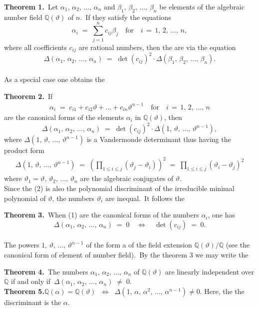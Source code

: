 \documentclass[12pt]{article}
\theoremstyle{definition}
\begin{document}
\textbf{Theorem 1.}\, Let $\alpha_1,\,\alpha_2,\,\ldots,\,\alpha_n$ and $\beta_1,\,\beta_2,\,\ldots,\,\beta_n$ be elements of the algebraic number field $\mathbb{Q}(\vartheta)$ of  $n$.\, If they satisfy the equations
$$\alpha_i \;=\; \sum_{j=1}^nc_{ij}\beta_j \quad \mbox{for} \quad i \,=\, 1,\,2,\,\ldots,\,n,$$
where all coefficients $c_{ij}$ are rational numbers, then the  are  via the equation
$$\Delta(\alpha_1,\,\alpha_2,\,\ldots,\,\alpha_n) 
  \;=\; \det\!(c_{ij})^2\cdot\Delta(\beta_1,\,\beta_2,\,\ldots,\,\beta_n).$$\\

As a special case one obtains the

\textbf{Theorem 2.}\, If
\begin{align}
\alpha_i \;=\; c_{i1}+c_{i2}\vartheta+\ldots+c_{in}\vartheta^{n-1} \quad \mbox{for} \quad i \,=\, 1,\,2,\,\ldots,\,n
\end{align}
are the canonical forms of the elements $\alpha_i$ in $\mathbb{Q}(\vartheta)$, then 
$$\Delta(\alpha_1,\,\alpha_2,\,\ldots,\,\alpha_n) 
  \;=\; \det\!(c_{ij})^2\cdot\Delta(1,\,\vartheta,\,\ldots,\,\vartheta^{n-1}),$$
where $\Delta(1,\,\vartheta,\,\ldots,\,\vartheta^{n-1})$ is a Vandermonde determinant thus
having the product form
\begin{align}
\Delta(1,\,\vartheta,\,\ldots,\,\vartheta^{n-1}) 
\;=\; \left(\prod_{1 \le i \le j}(\vartheta_j-\vartheta_i)\right)^{\!2} 
\;=\; \prod_{1 \le i \le j}(\vartheta_i-\vartheta_j)^2
\end{align}
where $\vartheta_1 = \vartheta,\,\vartheta_2,\,\ldots,\,\vartheta_n$ are the algebraic conjugates of $\vartheta$.\\

Since the  (2) is also the polynomial discriminant of the irreducible minimal polynomial of $\vartheta$, the numbers $\vartheta_i$ are inequal.\, It follows the

\textbf{Theorem 3.}\, When (1) are the canonical forms of the numbers $\alpha_i$, one has
$$\Delta(\alpha_1,\,\alpha_2,\,\ldots,\,\alpha_n) \;=\; 0 \quad 
\Longleftrightarrow \quad \det(c_{ij}) \;=\; 0.$$\\

The powers $1,\,\vartheta,\,\ldots,\,\vartheta^{n-1}$ of the  form a  of the field extension $\mathbb{Q}(\vartheta)/\mathbb{Q}$ (see the canonical form of element of number field).\, By the theorem 3 we may write the

\textbf{Theorem 4.}\, The numbers $\alpha_1,\,\alpha_2,\,\ldots,\,\alpha_n$ of $\mathbb{Q}(\vartheta)$ are linearly independent over $\mathbb{Q}$ if and only if\, $\Delta(\alpha_1,\,\alpha_2,\,\ldots,\,\alpha_n) \;\neq\; 0$.\\

\textbf{Theorem 5.}\quad $\displaystyle \mathbb{Q}(\alpha) = \mathbb{Q}(\vartheta)
\;\; \Longleftrightarrow \;\; \Delta(1,\,\alpha,\,\alpha^2,\,\ldots,\,\alpha^{n-1}) \neq 0$.\; Here, the the discriminant is the  $\alpha$.
  

\end{document}
